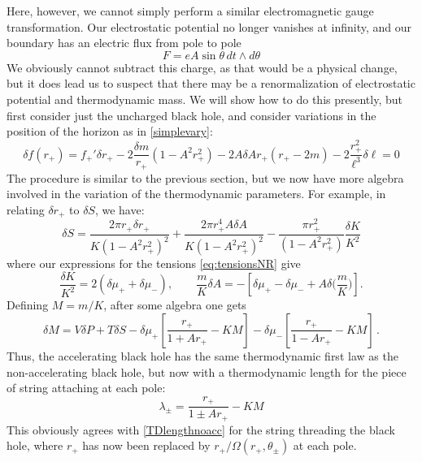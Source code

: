 \documentclass[
twoside,
openright,
frontopenright
]{dmathesis}
\begin{document}
Here, however, we cannot simply perform a similar electromagnetic
gauge transformation. Our electrostatic potential no longer
vanishes at infinity, and our boundary has an electric flux from pole to pole
\begin{equation}
F = eA \sin\theta \, dt \wedge d\theta
\end{equation}
We obviously cannot subtract this charge, as that would be a physical change,
but it does lead us to suspect that there may be a renormalization of
electrostatic potential and thermodynamic mass. We will show how to do this
presently, but first consider just the uncharged black hole, and consider
variations in the position of the horizon as in \cref{simplevary}:
\begin{equation}
\delta f(r_+) = f_+' \delta r_+  - 2 \frac{\delta m}{r_+} (1-A^2r_+^2)
- 2 A \delta A r_+ (r_+ - 2m) - 2 \frac{r_+^2}{\ell^3} \delta \ell = 0
\end{equation}
The procedure is similar to the previous section, but we now have
more algebra involved in the variation of the thermodynamic parameters.
For example, in relating $\delta r_+$ to $\delta S$, we have:
\begin{equation}
\delta S = \frac{2\pi r_+ \delta r_+}{K(1-A^2 r_+^2)^2} + 
\frac{2 \pi r_+^4 A\delta A}{K (1-A^2 r_+^2)^2} - 
\frac{\pi r_+^2}{(1-A^2 r_+^2)} \frac{\delta K}{K^2}
\end{equation}
where our expressions for the tensions \cref{eq:tensionsNR} give
\begin{equation}
\frac{\delta K}{K^2} = 2 \left ( \delta \mu_+ + \delta \mu_- \right ), \qquad \frac{m}{K} \delta A = - \left [
\delta \mu_+ - \delta \mu_- + A \delta \Big(\frac{m}{K}\Big) \right].
\end{equation}
Defining $M=m/K$, after some algebra one gets
\begin{equation}
\delta M = V\delta P + T \delta S -
\delta \mu_+ \left [ \frac{r_+}{1+Ar_+} - KM \right ] -
\delta \mu_- \left [ \frac{r_+}{1-Ar_+} - KM \right ] \,.
\label{firstaccm}
\end{equation}
Thus, the accelerating black hole has the same thermodynamic first law
as the non-accelerating black hole, but now with a thermodynamic length
for the piece of string attaching at each pole:
\begin{equation}
\lambda_\pm = \frac{r_+}{1 \pm Ar_+} - KM
\end{equation}
This obviously agrees with \cref{TDlengthnoacc} for the string
threading the black hole, where $r_+$ has now been replaced by
$r_+/\Omega(r_+,\theta_\pm)$ at each pole.
\end{document}

